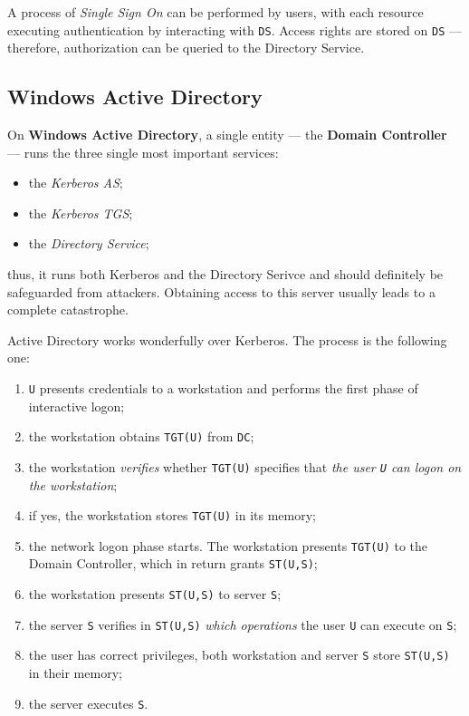\documentclass[10pt]{extreport}
\begin{document}
A process of \emph{Single Sign On} can be performed by users, with each
resource executing authentication by interacting with \texttt{DS}. Access
rights are stored on \texttt{DS} --- therefore, authorization can be queried to
the Directory Service.

\subsection{Windows Active Directory}

On \textbf{Windows Active Directory}, a single entity --- the \textbf{Domain
Controller} --- runs the three single most important services:
\begin{itemize}
    \item the \emph{Kerberos AS};
    \item the \emph{Kerberos TGS};
    \item the \emph{Directory Service};
\end{itemize}
thus, it runs both Kerberos and the Directory Serivce and should definitely be
safeguarded from attackers. Obtaining access to this server usually leads to a
complete catastrophe.

Active Directory works wonderfully over Kerberos. The process is the following
one:
\begin{enumerate}
    \item \texttt{U} presents credentials to a workstation and performs the
        first phase of interactive logon;
    \item the workstation obtains \texttt{TGT(U)} from \texttt{DC};
    \item the workstation \emph{verifies} whether \texttt{TGT(U)} specifies
        that \emph{the user \texttt{U} can logon on the workstation};
    \item if yes, the workstation stores \texttt{TGT(U)} in its memory;
    \item the network logon phase starts. The workstation presents
        \texttt{TGT(U)} to the Domain Controller, which in return grants
        \texttt{ST(U,S)};
    \item the workstation presents \texttt{ST(U,S)} to server \texttt{S};
    \item the server \texttt{S} verifies in \texttt{ST(U,S)} \emph{which
        operations} the user \texttt{U} can execute on \texttt{S};
    \item the user has correct privileges, both workstation and server
        \texttt{S} store \texttt{ST(U,S)} in their memory;
    \item the server executes \texttt{S}.
\end{enumerate}
\end{document}
